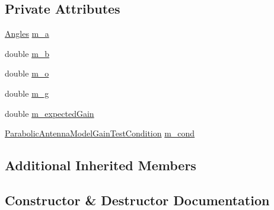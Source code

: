 \subsection*{Private Attributes}
\begin{DoxyCompactItemize}
\item 
\hyperlink{structns3_1_1Angles}{Angles} \hyperlink{classParabolicAntennaModelTestCase_abc4d736d6bd715f32979afeab943e4c2}{m\+\_\+a}
\item 
double \hyperlink{classParabolicAntennaModelTestCase_a47c608c3e9b8c7a7a375bd4b69486676}{m\+\_\+b}
\item 
double \hyperlink{classParabolicAntennaModelTestCase_a7a7993a6ec28b5cf48260fdddce9a2cc}{m\+\_\+o}
\item 
double \hyperlink{classParabolicAntennaModelTestCase_a09563db4a4afb154d43d8fe10804ed72}{m\+\_\+g}
\item 
double \hyperlink{classParabolicAntennaModelTestCase_ad9e9cf3db4f01deaec594b62d9000652}{m\+\_\+expected\+Gain}
\item 
\hyperlink{test-parabolic-antenna_8cc_a893d085fdc93f5aae203e0153fb83d32}{Parabolic\+Antenna\+Model\+Gain\+Test\+Condition} \hyperlink{classParabolicAntennaModelTestCase_ad4821987367dbacb8ee439e208e4331c}{m\+\_\+cond}
\end{DoxyCompactItemize}
\subsection*{Additional Inherited Members}


\subsection{Constructor \& Destructor Documentation}
